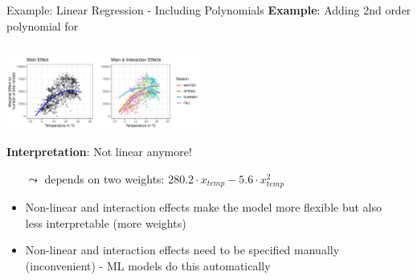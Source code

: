 \documentclass[11pt,compress,t,notes=noshow, aspectratio=169, xcolor=table]{beamer}
\def\firstrowcolor{}
\def\secondrowcolor{}
\def\thirdrowcolor{}
\def\fourthrowcolor{}
\begin{document}
\begin{frame}{Example: Linear Regression - Including Polynomials}
\textbf{Example}: Adding 2nd order polynomial for  
\begin{columns}[T, totalwidth=\linewidth]
\begin{column}{0.65\linewidth}
\includegraphics[width=0.5\textwidth, trim=0cm 0.1cm 10.4cm 0cm, clip]{figure/poly_main_vs_interaction_effects.pdf}

\textbf{Interpretation}: Not linear anymore!
\begin{itemize}
    \item[$\leadsto$]  depends on two weights: $280.2 \cdot x_{temp} - 5.6 \cdot x_{temp}^2$
    \item<2>[$\leadsto$] Non-linear and interaction effects make the model more flexible but also less interpretable (more weights)
    \item<2>[$\leadsto$] Non-linear and interaction effects need to be specified manually (inconvenient) - ML models do this automatically
\end{itemize}

\end{column}
\begin{column}{0.35\linewidth}
\begin{scriptsize}

\def\firstrowcolor{\rowcolor{lightgray}}%
\def\secondrowcolor{\rowcolor{spring}}%
\def\thirdrowcolor{\rowcolor{summer}}%
\def\fourthrowcolor{\rowcolor{fall}}%


\end{scriptsize}
\end{column}
\end{columns}
\end{frame}
\end{document}
